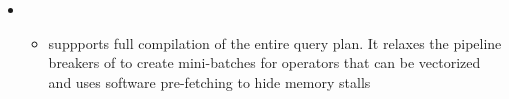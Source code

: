 \documentclass[11pt]{article}
\begin{document}
\begin{itemize}
    \item {}~\cite{menon2017}
    \begin{itemize}
        \item 
         suppports full compilation of the entire query plan.
        It relaxes the pipeline breakers of  to create mini-batches for operators that 
        can be vectorized and uses software pre-fetching to hide memory stalls
    \end{itemize}
\end{itemize}


\newpage


\end{document}
